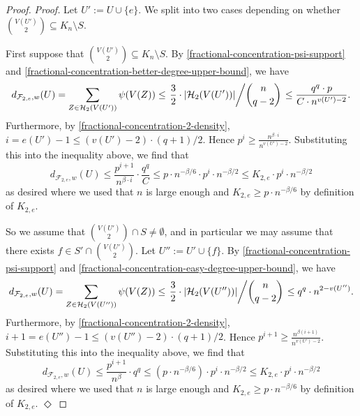 \documentclass[11pt]{article}
\numberwithin{equation}{section}
\newcommand{\mc}[1]{\mathcal{#1}}
\newcounter{i}
\theoremstyle{plain}
\newenvironment{proofclaim}[1][]%
{\noindent \emph{Proof.} {}{#1}{}}{\hfill
	$\Diamond$\vspace{1em}}
\theoremstyle{plain} %
\theoremstyle{definition}
\newcommand{\cF}{\mathcal{F}}
\newcommand{\cH}{\mathcal{H}}
\begin{document}
\begin{proof}
\begin{proofclaim}
Let $U':=U\cup \{e\}$. We split into two cases depending on whether $\binom{V(U')}{2} \subseteq K_n\setminus S$. 


First suppose that $\binom{V(U')}{2} \subseteq K_n\setminus S$. 
By \eqref{fractional-concentration-psi-support} and \ref{fractional-concentration-better-degree-upper-bound}, we have
\begin{equation*}
    d_{\cF_{2,e},w}(U) = \sum_{Z\in \mc{H}_2(V(U'))} \psi(V(Z)) \leq \left.\frac{3}{2}\cdot |\cH_2(V(U'))|\middle/\binom{n}{q - 2}\right. \leq \frac{q^q\cdot p}{C\cdot n^{v(U') - 2}}.
\end{equation*}
Furthermore, by \ref{fractional-concentration-2-density}, $i=e(U')-1\le (v(U')-2)\cdot (q+1) / 2$.  Hence $p^i \ge \frac{n^{\beta\cdot i}}{n^{v(U')-2}}$.
Substituting this into the inequality above, we find that
$$d_{\cF_{2,e},w}(U) \le \frac{p^{i+1}}{n^{\beta\cdot i}}\cdot \frac{q^q}{C} \le p\cdot n^{-\beta/6} \cdot p^i\cdot n^{-\beta/2} \le K_{2,e}\cdot p^i\cdot n^{-\beta/2}$$
as desired where we used that $n$ is large enough and $K_{2,e} \ge p\cdot n^{-\beta/6}$ by definition of $K_{2,e}$.

So we assume that $\binom{V(U')}{2} \cap S\ne \emptyset$, and in particular we may assume that there exists $f \in S' \cap \binom{V(U')}{2}$.
Let $U'':= U'\cup \{f\}$.
By \eqref{fractional-concentration-psi-support} and \ref{fractional-concentration-easy-degree-upper-bound}, we have
\begin{equation*}
    d_{\cF_{2,e},w}(U) = \sum_{Z\in \mc{H}_2(V(U''))} \psi(V(Z)) \leq \left.\frac{3}{2}\cdot |\cH_2(V(U''))|\middle/\binom{n}{q - 2}\right. \leq q^q \cdot n^{2 - v(U'')}.
\end{equation*}
Furthermore, by \ref{fractional-concentration-2-density}, $i + 1 =e(U'')-1\le (v(U'')-2)\cdot (q+1) / 2$.  Hence $p^{i+1} \ge \frac{n^{\beta(i+1)}}{n^{v(U')-2}}$.
Substituting this into the inequality above, we find that
$$d_{\cF_{2,e},w}(U) \le \frac{p^{i+1}}{n^{\beta}}\cdot q^q \le (p\cdot n^{-\beta/6}) \cdot p^i\cdot n^{-\beta/2} \le K_{2,e}\cdot p^i\cdot n^{-\beta/2}$$
as desired where we used that $n$ is large enough and $K_{2,e} \ge p\cdot n^{-\beta/6}$ by definition of $K_{2,e}$. 
\end{proofclaim}


\end{proof}
\end{document}
